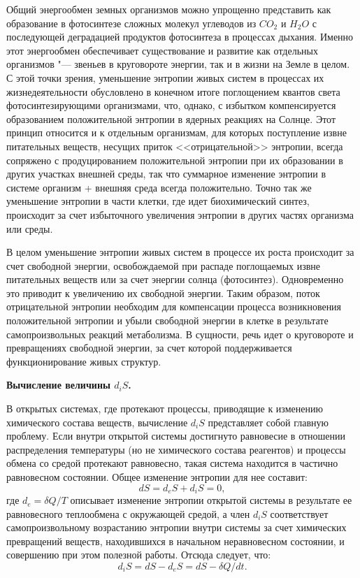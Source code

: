 \documentclass[12pt,a4paper,oneside]{book}
\begin{document}
Общий энергообмен земных организмов можно упрощенно представить как образование в фотосинтезе сложных молекул углеводов из $CO_2$ и $H_2O$ с последующей деградацией продуктов фотосинтеза в процессах дыхания. Именно этот энергообмен обеспечивает существование и развитие как отдельных организмов "--- звеньев в круговороте энергии, так и в жизни на Земле в целом. С этой точки зрения, уменьшение энтропии живых систем в процессах их жизнедеятельности обусловлено в конечном итоге поглощением квантов света фотосинтезирующими организмами, что, однако, с избытком компенсируется образованием положительной энтропии в ядерных реакциях на Солнце. Этот принцип относится и к отдельным организмам, для которых поступление извне питательных веществ, несущих приток <<отрицательной>> энтропии, всегда сопряжено с продуцированием положительной энтропии при их образовании в других участках внешней среды, так что суммарное изменение энтропии в системе организм + внешняя среда всегда положительно. Точно так же уменьшение энтропии в части клетки, где идет биохимический синтез, происходит за счет избыточного увеличения энтропии в других частях организма или среды.

В целом уменьшение энтропии живых систем в процессе их роста происходит за счет свободной энергии, освобождаемой при распаде поглощаемых извне питательных веществ или за счет энергии солнца (фотосинтез). Одновременно это приводит к увеличению их свободной энергии. Таким образом, поток отрицательной энтропии необходим для компенсации процесса возникновения положительной энтропии и убыли свободной энергии в клетке в результате самопроизвольных реакций метаболизма. В сущности, речь идет о круговороте и превращениях свободной энергии, за счет которой поддерживается функционирование живых структур. 

\textbf{Вычисление величины $d_iS$.}

В открытых системах, где протекают процессы, приводящие к изменению химического состава веществ, вычисление $d_iS$ представляет собой главную проблему. Если внутри открытой системы достигнуто равновесие в отношении распределения температуры (но не химического состава реагентов) и процессы обмена со средой протекают равновесно, такая система находится в частично равновесном состоянии. Общее изменение энтропии для нее составит:
\begin{equation}
	dS = d_e S + d_i S = 0,
\end{equation}
где $d_e = \delta Q/T$ описывает изменение энтропии открытой системы в результате ее равновесного теплообмена с окружающей средой, а член $d_iS$ соответствует самопроизвольному возрастанию энтропии внутри системы за счет химических превращений веществ, находившихся в начальном неравновесном состоянии, и совершению при этом полезной работы.
Отсюда следует, что:
\begin{equation}
	\label{eq.205}
	d_i S = d S - d_e S = dS - \delta Q / dt.
\end{equation}
\end{document}

